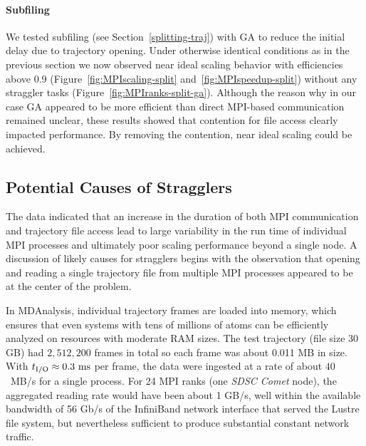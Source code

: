\paragraph{Subfiling}
We tested subfiling (see Section~\ref{splitting-traj}) with GA to reduce the initial delay due to trajectory opening.
Under otherwise identical conditions as in the previous section we now observed near ideal scaling behavior with efficiencies above 0.9 (Figure~\ref{fig:MPIscaling-split} and~\ref{fig:MPIspeedup-split}) without any straggler tasks (Figure~\ref{fig:MPIranks-split-ga}).
Although the reason why in our case GA appeared to be more efficient than direct MPI-based communication remained unclear, these results showed that contention for file access clearly impacted performance.
By removing the contention, near ideal scaling could be achieved.


\subsection{Potential Causes of Stragglers}
\label{sec:likelycauses}

The data indicated that an increase in the duration of both MPI communication and trajectory file access lead to large variability in the run time of individual MPI processes and ultimately poor scaling performance beyond a single node.
A discussion of likely causes for stragglers begins with the observation that opening and reading a single trajectory file from multiple MPI processes appeared to be at the center of the problem. 

In MDAnalysis, individual trajectory frames are loaded into memory, which ensures that even systems with tens of millions of atoms can be efficiently analyzed on resources with moderate RAM sizes.
The test trajectory (file size 30 GB) had $2,512,200$ frames in total so each frame was about 0.011 MB in size.
With ${t}_{\text{I/O}} \approx 0.3~\text{ms}$ per frame, the data were ingested at a rate of about $40$~MB/s for a single process.
For 24 MPI ranks (one \emph{SDSC Comet} node), the aggregated reading rate would have been about 1 GB/s, well within the available bandwidth of 56 Gb/s of the InfiniBand network interface that served the Lustre file system, but nevertheless sufficient to produce substantial constant network traffic.

